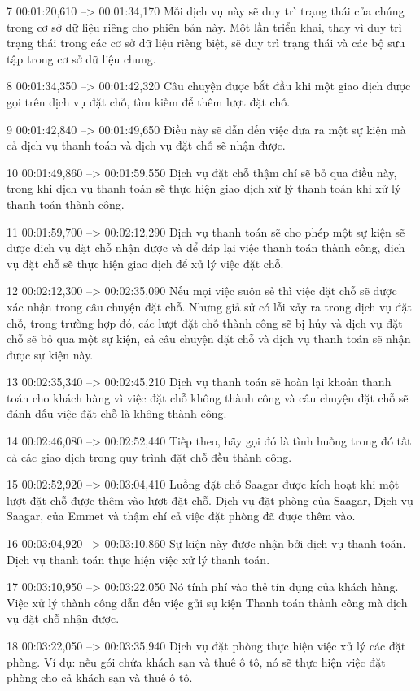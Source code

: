 7
00:01:20,610 --> 00:01:34,170
Mỗi dịch vụ này sẽ duy trì trạng thái của chúng trong cơ sở dữ liệu riêng cho phiên bản này.  Một lần triển khai, thay vì duy trì trạng thái trong các cơ sở dữ liệu riêng biệt, sẽ duy trì trạng thái và các bộ sưu tập trong cơ sở dữ liệu chung.

8
00:01:34,350 --> 00:01:42,320
Câu chuyện được bắt đầu khi một giao dịch được gọi trên dịch vụ đặt chỗ, tìm kiếm để thêm lượt đặt chỗ.

9
00:01:42,840 --> 00:01:49,650
Điều này sẽ dẫn đến việc đưa ra một sự kiện mà cả dịch vụ thanh toán và dịch vụ đặt chỗ sẽ nhận được.

10
00:01:49,860 --> 00:01:59,550
Dịch vụ đặt chỗ thậm chí sẽ bỏ qua điều này, trong khi dịch vụ thanh toán sẽ thực hiện giao dịch xử lý thanh toán khi xử lý thanh toán thành công.

11
00:01:59,700 --> 00:02:12,290
Dịch vụ thanh toán sẽ cho phép một sự kiện sẽ được dịch vụ đặt chỗ nhận được và để đáp lại việc thanh toán thành công, dịch vụ đặt chỗ sẽ thực hiện giao dịch để xử lý việc đặt chỗ.

12
00:02:12,300 --> 00:02:35,090
Nếu mọi việc suôn sẻ thì việc đặt chỗ sẽ được xác nhận trong câu chuyện đặt chỗ.  Nhưng giả sử có lỗi xảy ra trong dịch vụ đặt chỗ, trong trường hợp đó, các lượt đặt chỗ thành công sẽ bị hủy và dịch vụ đặt chỗ sẽ bỏ qua một sự kiện, cả câu chuyện đặt chỗ và dịch vụ thanh toán sẽ nhận được sự kiện này.

13
00:02:35,340 --> 00:02:45,210
Dịch vụ thanh toán sẽ hoàn lại khoản thanh toán cho khách hàng vì việc đặt chỗ không thành công và câu chuyện đặt chỗ sẽ đánh dấu việc đặt chỗ là không thành công.

14
00:02:46,080 --> 00:02:52,440
Tiếp theo, hãy gọi đó là tình huống trong đó tất cả các giao dịch trong quy trình đặt chỗ đều thành công.

15
00:02:52,920 --> 00:03:04,410
Luồng đặt chỗ Saagar được kích hoạt khi một lượt đặt chỗ được thêm vào lượt đặt chỗ.  Dịch vụ đặt phòng của Saagar, Dịch vụ Saagar, của Emmet và thậm chí cả việc đặt phòng đã được thêm vào.

16
00:03:04,920 --> 00:03:10,860
Sự kiện này được nhận bởi dịch vụ thanh toán.  Dịch vụ thanh toán thực hiện việc xử lý thanh toán.

17
00:03:10,950 --> 00:03:22,050
Nó tính phí vào thẻ tín dụng của khách hàng.  Việc xử lý thành công dẫn đến việc gửi sự kiện Thanh toán thành công mà dịch vụ đặt chỗ nhận được.

18
00:03:22,050 --> 00:03:35,940
Dịch vụ đặt phòng thực hiện việc xử lý các đặt phòng.  Ví dụ: nếu gói chứa khách sạn và thuê ô tô, nó sẽ thực hiện việc đặt phòng cho cả khách sạn và thuê ô tô.

